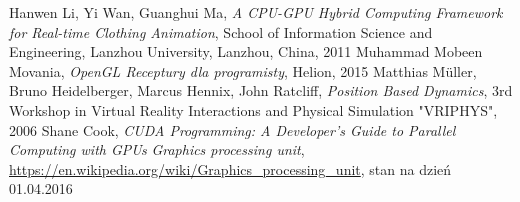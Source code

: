 \begin{thebibliography}{999}

 Hanwen Li, Yi Wan, Guanghui Ma, \emph{A CPU-GPU Hybrid Computing Framework for Real-time Clothing Animation}, School of Information Science and Engineering, Lanzhou University, Lanzhou, China, 2011
 Muhammad Mobeen Movania, \emph{OpenGL Receptury dla programisty}, Helion, 2015
 Matthias Müller, Bruno Heidelberger, Marcus Hennix, John Ratcliff, \emph{Position Based Dynamics}, 3rd Workshop in Virtual Reality Interactions and Physical Simulation "VRIPHYS", 2006
 Shane Cook, \emph{CUDA Programming: A Developer's Guide to Parallel Computing with GPUs}
 \emph{Graphics processing unit}, \href{https://en.wikipedia.org/wiki/Graphics\_processing\_unit}{https://en.wikipedia.org/wiki/Graphics\_processing\_unit}, stan na dzień 01.04.2016

\end{thebibliography}
